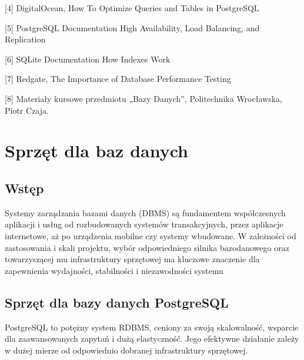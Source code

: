 \documentclass[a4paper,11pt,openany,english]{sphinxmanual}
\begin{document}
\sphinxAtStartPar
{[}4{]} DigitalOcean, How To Optimize Queries and Tables in PostgreSQL

\sphinxAtStartPar
{[}5{]} PostgreSQL Documentation \textendash{} High Availability, Load Balancing, and Replication

\sphinxAtStartPar
{[}6{]} SQLite Documentation \textendash{} How Indexes Work

\sphinxAtStartPar
{[}7{]} Redgate, The Importance of Database Performance Testing

\sphinxAtStartPar
{[}8{]} Materiały kursowe przedmiotu „Bazy Danych”, Politechnika Wrocławska, Piotr Czaja.

\sphinxstepscope


\section{Sprzęt dla baz danych}
\label{\detokenize{rozdzial2/Sprzet-dla-bazy-danych/source/SprzetDlaBazyDanych:sprzet-dla-baz-danych}}\label{\detokenize{rozdzial2/Sprzet-dla-bazy-danych/source/SprzetDlaBazyDanych::doc}}

\subsection{Wstęp}
\label{\detokenize{rozdzial2/Sprzet-dla-bazy-danych/source/SprzetDlaBazyDanych:wstep}}
\sphinxAtStartPar
Systemy zarządzania bazami danych (DBMS) są fundamentem współczesnych aplikacji i usług \textendash{} od rozbudowanych systemów transakcyjnych, przez aplikacje internetowe, aż po urządzenia mobilne czy systemy wbudowane. W zależności od zastosowania i skali projektu, wybór odpowiedniego silnika bazodanowego oraz towarzyszącej mu infrastruktury sprzętowej ma kluczowe znaczenie dla zapewnienia wydajności, stabilności i niezawodności systemu


\subsection{Sprzęt dla bazy danych PostgreSQL}
\label{\detokenize{rozdzial2/Sprzet-dla-bazy-danych/source/SprzetDlaBazyDanych:sprzet-dla-bazy-danych-postgresql}}
\sphinxAtStartPar
PostgreSQL to potężny system RDBMS, ceniony za swoją skalowalność, wsparcie dla zaawansowanych zapytań i dużą elastyczność. Jego efektywne działanie zależy w dużej mierze od odpowiednio dobranej infrastruktury sprzętowej.
\end{document}
